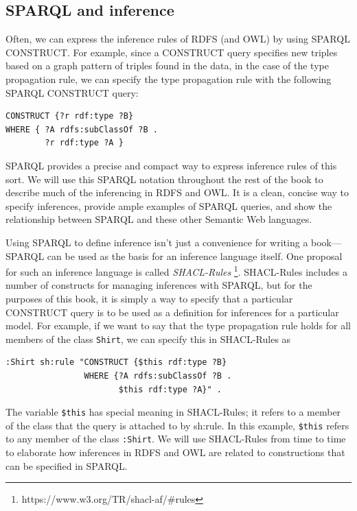 \subsection{SPARQL and inference}
\label{shacl-rules}
Often, we can express the inference rules of RDFS (and OWL) by using
SPARQL CONSTRUCT. For example, since a CONSTRUCT query specifies new
triples based on a graph pattern of triples found in
the data, in the case of the type propagation rule, we can specify the
type propagation rule with the following SPARQL CONSTRUCT query:

\begin{lstlisting}
CONSTRUCT {?r rdf:type ?B}
WHERE { ?A rdfs:subClassOf ?B .
        ?r rdf:type ?A }
\end{lstlisting}

SPARQL provides a precise and compact way to express inference rules of
this sort. We will use this SPARQL notation throughout the rest of the
book to describe much of the inferencing in RDFS and OWL. It is a clean,
concise way to specify inferences, provide ample examples of SPARQL
queries, and show the relationship between SPARQL and these other
Semantic Web languages.

Using SPARQL to define inference isn't just a convenience for writing a
book---SPARQL can be used as the basis for an inference language itself.
One proposal for such an inference language is called 
\emph{SHACL-Rules} \footnote{https://www.w3.org/TR/shacl-af/\#rules}. 
SHACL-Rules includes a number of constructs for managing
inferences with SPARQL, but for the purposes of this book, it is
simply a way to specify that a particular CONSTRUCT query is to be used
as a definition for inferences for a particular model. For example, if
we want to say that the type propagation rule holds for all members of
the class \texttt{Shirt}, we can specify this in SHACL-Rules as

\begin{lstlisting}
:Shirt sh:rule "CONSTRUCT {$this rdf:type ?B}
                WHERE {?A rdfs:subClassOf ?B .
                       $this rdf:type ?A}" .
\end{lstlisting}

The variable \texttt{\$this} has special meaning in SHACL-Rules; 
it refers to a member of
the class that the query is attached to by sh:rule. In this example,
\texttt{\$this} refers to any member of the class \texttt{:Shirt}. 
We will use SHACL-Rules from
time to time to elaborate how inferences in RDFS and OWL are related to
constructions that can be specified in SPARQL.

